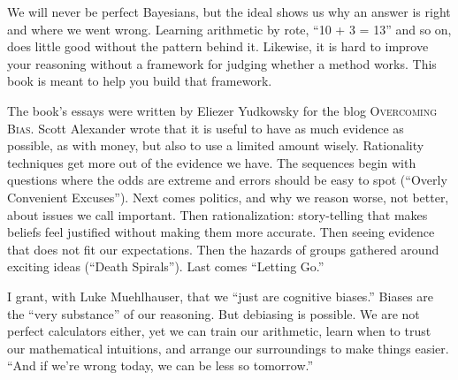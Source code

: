 We will never be perfect Bayesians, but the ideal shows us why an answer is right and where we went wrong. Learning arithmetic by rote, ``10 + 3 = 13'' and so on, does little good without the pattern behind it. Likewise, it is hard to improve your reasoning without a framework for judging whether a method works. This book is meant to help you build that framework.

The book's essays were written by Eliezer Yudkowsky for the blog \textsc{Overcoming Bias}. Scott Alexander wrote that it is useful to have as much evidence as possible, as with money, but also to use a limited amount wisely. Rationality techniques get more out of the evidence we have. The sequences begin with questions where the odds are extreme and errors should be easy to spot (``Overly Convenient Excuses''). Next comes politics, and why we reason worse, not better, about issues we call important. Then rationalization: story-telling that makes beliefs feel justified without making them more accurate. Then seeing evidence that does not fit our expectations. Then the hazards of groups gathered around exciting ideas (``Death Spirals''). Last comes ``Letting Go.''

I grant, with Luke Muehlhauser, that we ``just are cognitive biases.'' Biases are the ``very substance'' of our reasoning. But debiasing is possible. We are not perfect calculators either, yet we can train our arithmetic, learn when to trust our mathematical intuitions, and arrange our surroundings to make things easier. ``And if we're wrong today, we can be less so tomorrow.'' 

